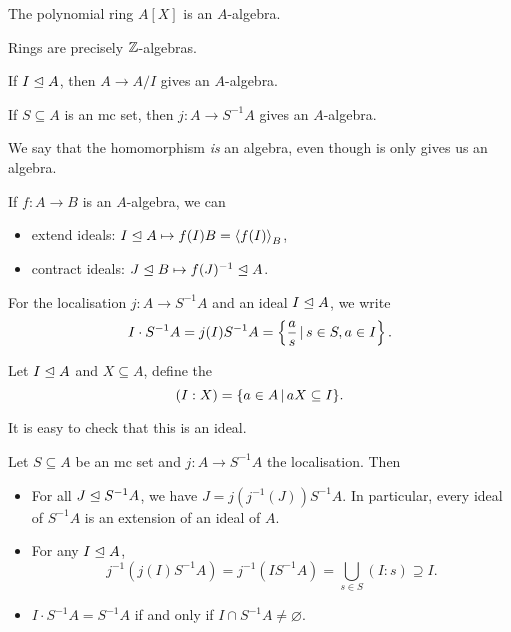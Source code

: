 \begin{example}
  The polynomial ring $A[X]$ is an $A$-algebra.
\end{example}

\begin{example}
  Rings are precisely $\mathbb{Z}$-algebras.
\end{example}

\begin{example}
  If $I \trianglelefteq A$, then $A \to A/I$ gives an $A$-algebra.
\end{example}

\begin{example}
  If $S \subseteq A$ is an mc set, then $j: A \to S^{-1} A$ gives an
  $A$-algebra.
\end{example}

\begin{remark}
  We say that the homomorphism \emph{is} an algebra, even though is only gives
  us an algebra.
\end{remark}

If $f: A \to B$ is an $A$-algebra, we can
\begin{itemize}
\item extend ideals: $I \trianglelefteq A \mapsto f(I) B = \left< f(I) \right>_B$,
\item contract ideals: $J \trianglelefteq B \mapsto f(J)^{-1} \trianglelefteq A$.
\end{itemize}

For the localisation $j: A \to S^{-1} A$ and an ideal $I \trianglelefteq A$,
we write
\[
  I \cdot S^{-1} A = j(I) S^{-1} A = \left\{ \frac{a}{s} \,|\, s \in S, a \in I
  \right\}.
\]

\begin{definition}
  Let $I \trianglelefteq A$ and $X \subseteq A$, define the 
  \[
	(I:X) = \{ a \in A \,|\, a X \subseteq I \}.
  \]
\end{definition}

\begin{remark}
  It is easy to check that this is an ideal.
\end{remark}

\begin{proposition}
  Let $S \subseteq A$ be an mc set and $j: A \to S^{-1} A$ the localisation.
  Then

  \begin{itemize}
  \item For all $J \trianglelefteq S^{-1} A$, we have $J = j(j^{-1}(J)) S^{-1}A$.
	In particular, every ideal of $S^{-1} A$ is an extension of an ideal of $A$.
  \item For any $I \trianglelefteq A$,
	\[
	  j^{-1}(j(I) S^{-1} A) = j^{-1}(I S^{-1} A) = \bigcup_{s \in S} (I:s)
	  \supseteq I.
	\]
  \item $I \cdot S^{-1} A = S^{-1} A$ if and only if $I \cap S^{-1} A \ne
	\varnothing$.
  \end{itemize}
\end{proposition}

